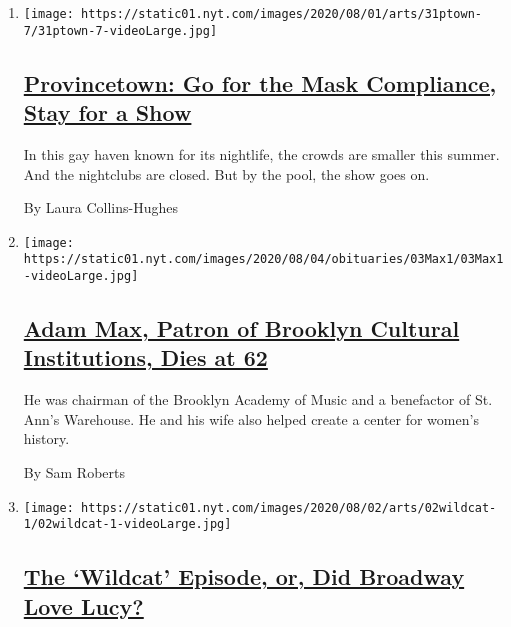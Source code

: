 \begin{enumerate}
\def\labelenumi{\arabic{enumi}.}
\item
  \texttt{[image: https://static01.nyt.com/images/2020/08/01/arts/31ptown-7/31ptown-7-videoLarge.jpg]}

  \hypertarget{provincetown-go-for-the-mask-compliance-stay-for-a-show}{%
  \subsection{\texorpdfstring{\href{/2020/07/31/theater/provincetown-nightlife-coronavirus.html}{Provincetown:
  Go for the Mask Compliance, Stay for a
  Show}}{Provincetown: Go for the Mask Compliance, Stay for a Show}}\label{provincetown-go-for-the-mask-compliance-stay-for-a-show}}

  In this gay haven known for its nightlife, the crowds are smaller this
  summer. And the nightclubs are closed. But by the pool, the show goes
  on.

  By Laura Collins-Hughes
\item
  \texttt{[image: https://static01.nyt.com/images/2020/08/04/obituaries/03Max1/03Max1-videoLarge.jpg]}

  \hypertarget{adam-max-patron-of-brooklyn-cultural-institutions-dies-at-62}{%
  \subsection{\texorpdfstring{\href{/2020/08/03/arts/adam-max-patron-of-brooklyn-cultural-institutions-dies-at-62.html}{Adam
  Max, Patron of Brooklyn Cultural Institutions, Dies at
  62}}{Adam Max, Patron of Brooklyn Cultural Institutions, Dies at 62}}\label{adam-max-patron-of-brooklyn-cultural-institutions-dies-at-62}}

  He was chairman of the Brooklyn Academy of Music and a benefactor of
  St. Ann's Warehouse. He and his wife also helped create a center for
  women's history.

  By Sam Roberts
\item
  \texttt{[image: https://static01.nyt.com/images/2020/08/02/arts/02wildcat-1/02wildcat-1-videoLarge.jpg]}

  \hypertarget{the-wildcat-episode-or-did-broadway-love-lucy}{%
  \subsection{\texorpdfstring{\href{/2020/07/31/theater/lucille-ball-wildcat.html}{The
  `Wildcat' Episode, or, Did Broadway Love
  Lucy?}}{The `Wildcat' Episode, or, Did Broadway Love Lucy?}}\label{the-wildcat-episode-or-did-broadway-love-lucy}}


\end{enumerate}
